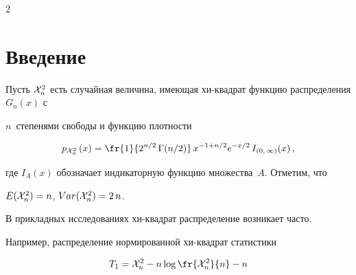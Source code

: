 









      \thispagestyle{headings}





      \begin{multicols}{2}


      


            \label{st\stat}





\section{Введение}





Пусть ${\cal X}_n^2$ есть случайная величина, имеющая хи-квад\-рат функцию распределения   $G_n(x)$ с 


$n$~степенями свободы  и функцию плотности


\begin{equation*}




p_{{\cal X}_n^2}\,(x) =


\fr{1}{2^{n/2}\,\Gamma(n/2)} \, x^{-1+n/2}  e^{-x/2}\,I_{(0,\,\infty)}(x)\,,


\end{equation*}


где $I_A(x)$ обозначает индикаторную функцию множества~$A$. Отметим, что


$ E({\cal X}_n^2) = n $,  $ Var({\cal X}_n^2) =2\,n$.





\smallskip





В прикладных исследованиях   хи-квад\-рат распределение возникает часто. 


Например, распределение нормированной хи-квад\-рат статистики


\begin{equation*}


T_1 = {\cal X}^2_n - n \log \fr{{\cal X}^2_n}{n} - n



\end{equation*}
\end{multicols}
